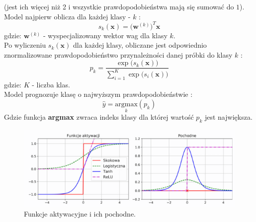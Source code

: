 \documentclass{article}
\renewcommand{\vec}[1]{\mathbf{#1}}
\begin{document}
\begin{itemize}
(jest ich więcej niż 2 i wszystkie prawdopodobieństwa mają się sumować do $1$).
Model najpierw oblicza dla każdej klasy - $k$ \cite{um}:
\begin{equation}
	s_k(\vec{x}) = \big(\vec{w}^{(k)}\big)^T\vec{x}
\end{equation}
gdzie: $\vec{w}^{(k)}$ - wyspecjalizowany wektor wag dla klasy $k$.\\
Po wyliczeniu $s_k(\vec{x})$ dla każdej klasy, obliczane jest odpowiednio znormalizowane 
prawdopodobieństwo przynależności danej próbki do klasy $k$ \cite{um}:
\begin{equation}
	p_k = \frac{\exp\big(s_k(\vec{x})\big)}{\sum_{i=1}^{K} \exp\big(s_i(\vec{x})\big)}
\end{equation}
gdzie: $K$ - liczba klas.\\ 
Model prognozuje klasę o najwyższym prawdopodobieństwie \cite{um}:
\begin{equation}
	\hat{y} = \underset{k}{\text{argmax}}(p_k)
\end{equation}
Gdzie funkcja \textbf{argmax} zwraca indeks klasy dla której wartość $p_k$ jest największa.\\
\end{itemize}

\begin{figure}[H]
\centering
\includegraphics[scale=0.6]{f_a.png}
\caption{Funkcje aktywacyjne i ich pochodne. \cite{um}}
\end{figure}
\end{document}
